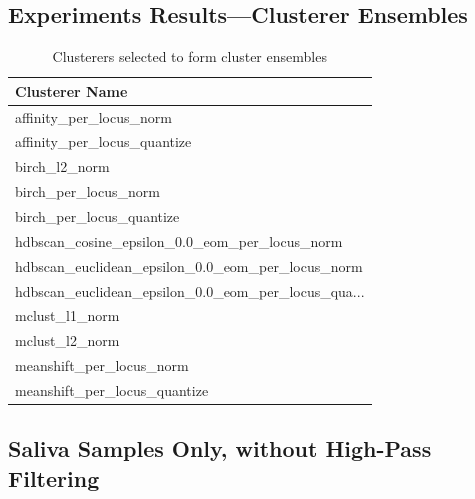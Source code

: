 \begin{theappendices}
\section{Experiments Results---Clusterer Ensembles}

\begin{table}[htbp]
\centering
\begin{tabular}{l}
\toprule
                                    Clusterer Name \\
\midrule
                           affinity\_per\_locus\_norm \\
                       affinity\_per\_locus\_quantize \\
                                     birch\_l2\_norm \\
                              birch\_per\_locus\_norm \\
                          birch\_per\_locus\_quantize \\
     hdbscan\_cosine\_epsilon\_0.0\_eom\_per\_locus\_norm \\
  hdbscan\_euclidean\_epsilon\_0.0\_eom\_per\_locus\_norm \\
hdbscan\_euclidean\_epsilon\_0.0\_eom\_per\_locus\_qua... \\
                                    mclust\_l1\_norm \\
                                    mclust\_l2\_norm \\
                          meanshift\_per\_locus\_norm \\
                      meanshift\_per\_locus\_quantize \\
\bottomrule
\end{tabular}
\caption{Clusterers selected to form cluster ensembles}
\label{appendix:table:Clusterers selected to form cluster ensembles}
\end{table}

\FloatBarrier
\subsection{Saliva Samples Only, without High-Pass Filtering}


\end{theappendices}
